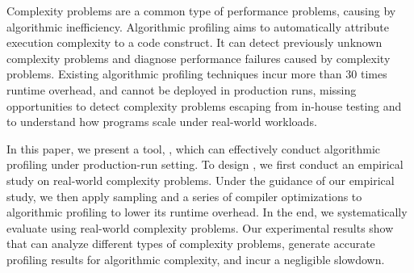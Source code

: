 

Complexity problems are a common type of performance problems, 
causing by algorithmic inefficiency. 
Algorithmic profiling aims to automatically attribute execution complexity to a code construct.
It can detect previously unknown complexity problems and diagnose performance failures 
caused by complexity problems. 
Existing algorithmic profiling techniques
incur more than $30$ times runtime overhead,
and cannot be deployed in production runs, missing opportunities 
to detect complexity problems escaping from in-house testing 
and to understand how programs scale under real-world workloads. 

In this paper, we present a tool, \Tool, 
which can effectively conduct algorithmic profiling under production-run setting. 
To design \Tool, we first conduct an empirical study on 
real-world complexity problems.
Under the guidance of our empirical study, we then apply 
sampling and a series of compiler optimizations to 
algorithmic profiling to lower its runtime overhead.
In the end, we systematically evaluate \Tool using real-world complexity problems. 
Our experimental results show that \Tool 
can analyze different types of complexity problems, 
generate accurate profiling results for algorithmic complexity, 
and incur a negligible slowdown. 




